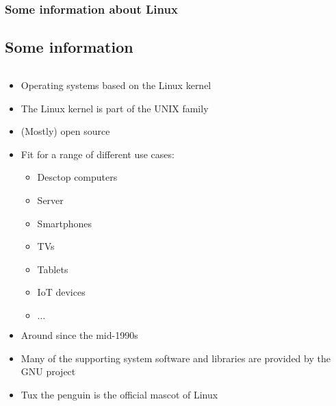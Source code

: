 \begin{frame}
	\frametitle{Some information about Linux}
	\subsection{Some information}
	
	\vfill
	\begin{columns}
		\begin{column}{.7\linewidth}
			\begin{itemize}
				\item Operating systems based on the Linux kernel\cite{linux}
				\item The Linux kernel is part of the UNIX family
				\item (Mostly) open source
				\item Fit for a range of different use cases:
				\begin{tiny}
					\begin{itemize}
						\item Desctop computers
						\item Server
						\item Smartphones
						\item TVs
						\item Tablets
						\item IoT devices
						\item $\dots$
					\end{itemize}
				\end{tiny}
				\item Around since the mid-1990s
				\item Many of the supporting system software and libraries are provided by the GNU project\cite{gnu}
				\item Tux the penguin is the official mascot of Linux
			\end{itemize}
		\end{column}
		\hfill
		\begin{column}{.28\linewidth}
			\resizebox{\linewidth}{!}{\usebox\mascotbox}
		\end{column}
	\end{columns}
	\vfill
\end{frame}
